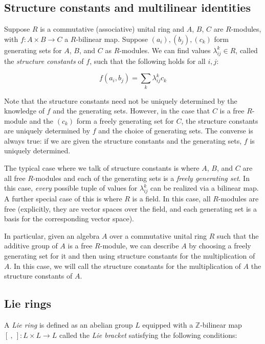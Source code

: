\subsection{Structure constants and multilinear identities}

Suppose $R$ is a commutative (associative) unital ring and $A$, $B$,
$C$ are $R$-modules, with $f:A \times B \to C$ a $R$-bilinear
map. Suppose $(a_i), (b_j),(c_k)$ form generating sets for $A$, $B$,
and $C$ as $R$-modules. We can find values $\lambda_{ij}^k \in R$,
called the {\em structure constants} of $f$, such that the following
holds for all $i,j$:

$$f(a_i,b_j) = \sum_k \lambda_{ij}^k c_k$$

Note that the structure constants need not be uniquely determined by
the knowledge of $f$ and the generating sets. However, in the case
that $C$ is a free $R$-module and the $(c_k)$ form a freely generating
set for $C$, the structure constants are uniquely determined by $f$
and the choice of generating sets. The converse is always true: if we
are given the structure constants and the generating sets, $f$ is
uniquely determined.

The typical case where we talk of structure constants is where $A$,
$B$, and $C$ are all free $R$-modules and each of the generating sets
is a {\em freely generating set}. In this case, {\em every} possible
tuple of values for $\lambda_{ij}^k$ can be realized via a bilinear
map. A further special case of this is where $R$ is a field. In this
case, all $R$-modules are free (explicitly, they are vector spaces
over the field, and each generating set is a basis for the
corresponding vector space).

In particular, given an algebra $A$ over a commutative unital ring $R$
such that the additive group of $A$ is a free $R$-module, we can
describe $A$ by choosing a freely generating set for it and then using
structure constants for the multiplication of $A$. In this case, we
will call the structure constants for the multiplication of $A$ the
structure constants of $A$.

\subsection{Lie rings}\label{appsec:Lie}

A {\em Lie ring} is defined as an abelian group $L$ equipped with a
$\mathbb{Z}$-bilinear map $[ \ , \ ]:L \times L \to L$ called the {\em
  Lie bracket} satisfying the following conditions:

